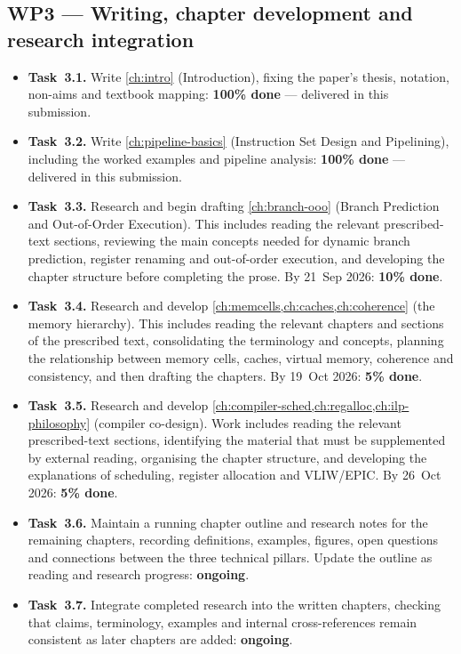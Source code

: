 \documentclass[11pt,a4paper]{report}
\begin{document}
\subsection*{WP3 --- Writing, chapter development and research integration}
\begin{itemize}[leftmargin=*]
  \item \textbf{Task~3.1.} Write \cref{ch:intro} (Introduction), fixing
    the paper's thesis, notation, non-aims and textbook mapping:
    \textbf{100\% done} --- delivered in this submission.

  \item \textbf{Task~3.2.} Write \cref{ch:pipeline-basics} (Instruction
    Set Design and Pipelining), including the worked examples and
    pipeline analysis: \textbf{100\% done} --- delivered in this
    submission.

  \item \textbf{Task~3.3.} Research and begin drafting
    \cref{ch:branch-ooo} (Branch Prediction and Out-of-Order
    Execution). This includes reading the relevant prescribed-text
    sections, reviewing the main concepts needed for dynamic branch
    prediction, register renaming and out-of-order execution, and
    developing the chapter structure before completing the prose. By
    21~Sep 2026: \textbf{10\% done}.

  \item \textbf{Task~3.4.} Research and develop
    \cref{ch:memcells,ch:caches,ch:coherence} (the memory hierarchy).
    This includes reading the relevant chapters and sections of the
    prescribed text, consolidating the terminology and concepts,
    planning the relationship between memory cells, caches, virtual
    memory, coherence and consistency, and then drafting the chapters.
    By 19~Oct 2026: \textbf{5\% done}.

  \item \textbf{Task~3.5.} Research and develop
    \cref{ch:compiler-sched,ch:regalloc,ch:ilp-philosophy} (compiler
    co-design). Work includes reading the relevant prescribed-text
    sections, identifying the material that must be supplemented by
    external reading, organising the chapter structure, and developing
    the explanations of scheduling, register allocation and VLIW/EPIC.
    By 26~Oct 2026: \textbf{5\% done}.

  \item \textbf{Task~3.6.} Maintain a running chapter outline and
    research notes for the remaining chapters, recording definitions,
    examples, figures, open questions and connections between the
    three technical pillars. Update the outline as reading and
    research progress: \textbf{ongoing}.

  \item \textbf{Task~3.7.} Integrate completed research into the
    written chapters, checking that claims, terminology, examples and
    internal cross-references remain consistent as later chapters are
    added: \textbf{ongoing}.
\end{itemize}
\end{document}
